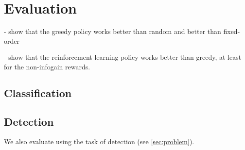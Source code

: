 \section{Evaluation} \label{sec:evaluation}
- show that the greedy policy works better than random and better than fixed-order

- show that the reinforcement learning policy works better than greedy, at least for the non-infogain rewards.

\subsection{Classification}

\subsection{Detection}
We also evaluate using the task of detection (see \autoref{sec:problem}).